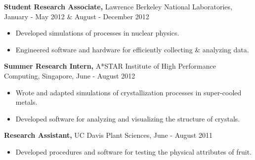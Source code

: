 \documentclass[margin]{res}
\begin{document}
\begin{resume}
 {\bf Student Research Associate,} Lawrence Berkeley National Laboratories, January - May 2012 \& August - December 2012
\begin{itemize} \itemsep -2pt
  \item Developed simulations of processes in nuclear physics. \item Engineered software and hardware for efficiently collecting \& analyzing data. \end{itemize}\vspace{-8pt}
{\bf Summer Research Intern,} A*STAR Institute of High Performance Computing, Singapore, June - August 2012
\begin{itemize} \itemsep -2pt
  \item Wrote and adapted simulations of crystallization processes in super-cooled metals. \item Developed software for analyzing and visualizing the structure of crystals. \end{itemize}\vspace{-8pt}
{\bf Research Assistant,} UC Davis Plant Sciences, June - August 2011
 \begin{itemize} \itemsep -2pt
  \item Developed procedures and software for testing the physical attributes of fruit. \end{itemize}


\end{resume}
\end{document}
